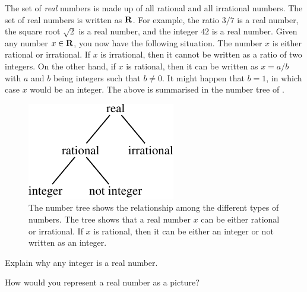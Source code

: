 \documentclass[a4paper,oneside,12pt]{article}
\begin{document}
The set of \emph{real} numbers is made up of all rational and all
irrational numbers.  The set of real numbers is written as $\mathbf{R}$.  For
example, the ratio $3/7$ is a real number, the square root $\sqrt{2}$
is a real number, and the integer $42$ is a real number.  Given any
number $x \in \mathbf{R}$, you now have the following situation.  The number
$x$ is either rational or irrational.  If $x$ is irrational, then it
cannot be written as a ratio of two integers.  On the other hand, if
$x$ is rational, then it can be written as $x = a / b$ with $a$ and
$b$ being integers such that $b \neq 0$.  It might happen that
$b = 1$, in which case $x$ would be an integer.  The above is
summarised in the number tree of .

\begin{figure}[!htbp]
\centering
\includegraphics[scale=1.1]{image/02/number-tree.pdf}
\caption{%
  The number tree shows the relationship among the different types of
  numbers.  The tree shows that a real number $x$ can be either
  rational or irrational.  If $x$ is rational, then it can be either
  an integer or not written as an integer.
}
\label{fig:number_tree}
\end{figure}

\begin{exercise}
Explain why any integer is a real number.
\end{exercise}


\begin{exercise}
How would you represent a real number as a picture?
\end{exercise}

\end{document}
